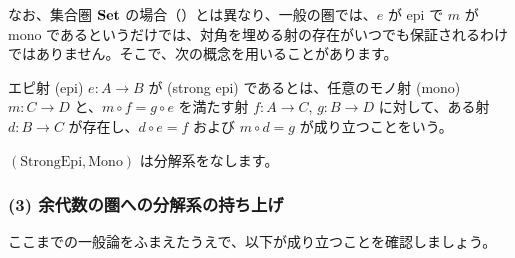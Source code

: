 \documentclass[
		head_space=20mm,
		foot_space=20mm,
		gutter=10mm,
		line_length=190mm
]{jlreq}
\begin{document}
\clearpage

なお、集合圏 $\mathbf{Set}$ の場合（）とは異なり、一般の圏では、$e$ が epi で $m$ が mono であるというだけでは、対角を埋める射の存在がいつでも保証されるわけではありません。そこで、次の概念を用いることがあります。

\begin{definition}
	エピ射 (epi) $e:A\to B$ が (strong epi) であるとは、任意のモノ射 (mono) $m:C\to D$ と、$m\circ f=g\circ e$ を満たす射 $f:A\to C$, $g:B\to D$ に対して、ある射 $d:B\to C$ が存在し、$d\circ e=f$ および $m\circ d=g$ が成り立つことをいう。
\end{definition}

\noindent $(\mathrm{StrongEpi},\mathrm{Mono})$ は分解系をなします。


\subsubsection*{(3) 余代数の圏への分解系の持ち上げ}

\noindent ここまでの一般論をふまえたうえで、以下が成り立つことを確認しましょう。
\end{document}
